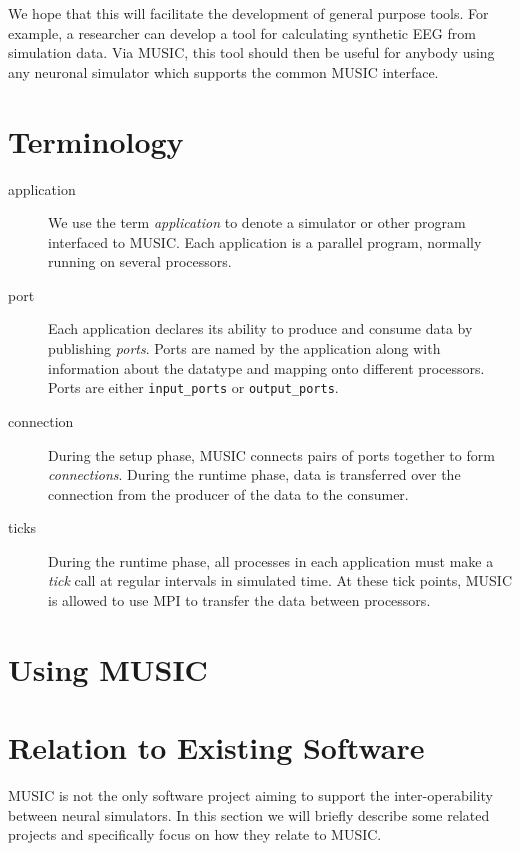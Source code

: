 \documentclass[a4paper]{report}
\begin{document}
We hope that this will facilitate the development of general purpose
tools.  For example, a researcher can develop a tool for calculating
synthetic EEG from simulation data.  Via MUSIC, this tool should then
be useful for anybody using any neuronal simulator which supports the
common MUSIC interface.


\section{Terminology}

\begin{description}
\item[application] We use the term
  \emph{application} to denote a simulator or other
  program interfaced to MUSIC.  Each application is a parallel
  program, normally running on several processors.

\item[port] Each application declares its ability to produce and
  consume data by publishing \emph{ports}.  Ports are
  named by the application along with information about the datatype
  and mapping onto different processors.  Ports are either
  \verb|input_ports| or
  \verb|output_ports|.

\item[connection] During the setup phase, MUSIC connects pairs of
  ports together to form \emph{connections}.  During
  the runtime phase, data is transferred over the connection from the
  producer of the data to the consumer.

\item[ticks] During the runtime phase, all processes in each
  application must make a \emph{tick} call at regular
  intervals in simulated time.  At these tick points, MUSIC is allowed
  to use MPI to transfer the data between processors.
\end{description}


\section{Using MUSIC}


\section{Relation to Existing Software}

MUSIC is not the only software project aiming to support the
inter-operability between neural simulators.  In this section we will
briefly describe some related projects and specifically focus on how
they relate to MUSIC.
\end{document}
